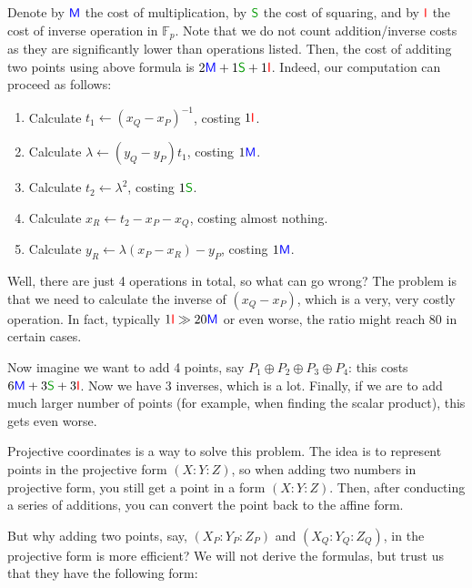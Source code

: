 \documentclass[../lecture-notes-148x210.tex]{subfiles}
\begin{document}
Denote by $\textcolor{blue}{\mathsf{M}}$ the cost of multiplication, by $\textcolor{green!60!black}{\mathsf{S}}$ the cost of squaring, and by $\textcolor{red}{\mathsf{I}}$ the cost of inverse operation in $\mathbb{F}_p$. Note that we do not count addition/inverse costs as they are significantly lower than operations listed. Then, the cost of additing two points using above formula is $2\textcolor{blue}{\mathsf{M}} + 1\textcolor{green!60!black}{\mathsf{S}} + 1\textcolor{red}{\mathsf{I}}$. Indeed, our computation can proceed as follows:
\begin{enumerate}
    \item Calculate $t_1 \gets (x_Q-x_P)^{-1}$, costing $1\textcolor{red}{\mathsf{I}}$.
    \item Calculate $\lambda \gets (y_Q-y_P)t_1$, costing $1\textcolor{blue}{\mathsf{M}}$.
    \item Calculate $t_2 \gets \lambda^2$, costing $1\textcolor{green!60!black}{\mathsf{S}}$.
    \item Calculate $x_R \gets t_2 - x_P - x_Q$, costing almost nothing.
    \item Calculate $y_R \gets \lambda (x_P-x_R) - y_P$, costing $1\textcolor{blue}{\mathsf{M}}$.
\end{enumerate}

Well, there are just 4 operations in total, so what can go wrong? The problem is that we need to calculate the inverse of $(x_Q-x_P)$, which is a very, very costly operation. In fact, typically $1\textcolor{red}{\mathsf{I}} \gg 20\textcolor{blue}{\mathsf{M}}$ or even worse, the ratio might reach $80$ in certain cases.

Now imagine we want to add 4 points, say $P_1 \oplus P_2 \oplus P_3 \oplus P_4$: this costs $6\textcolor{blue}{\mathsf{M}} + 3\textcolor{green!60!black}{\mathsf{S}} + 3\textcolor{red}{\mathsf{I}}$. Now we have 3 inverses, which is a lot. Finally, if we are to add much larger number of points (for example, when finding the scalar product), this gets even worse. 

Projective coordinates is a way to solve this problem. The idea is to represent points in the projective form $(X:Y:Z)$, so when adding two numbers in projective form, you still get a point in a form $(X:Y:Z)$. Then, after conducting a series of additions, you can convert the point back to the affine form. 

But why adding two points, say, $(X_P:Y_P:Z_P)$ and $(X_Q:Y_Q:Z_Q)$, in the projective form is more efficient? We will not derive the formulas, but trust us that they have the following form:
\begin{xequation*}
\end{xequation*}
\end{document}
